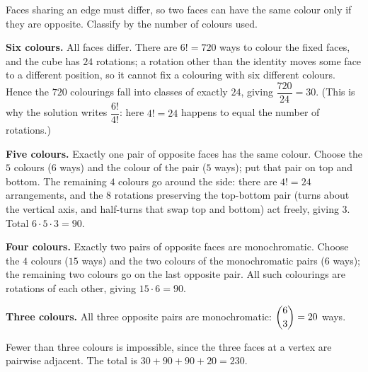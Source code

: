 Faces sharing an edge must differ, so two faces can have the same colour only if they are opposite. Classify by the number of colours used.

\textbf{Six colours.} All faces differ. There are $6!=720$ ways to colour the fixed faces, and the cube has $24$ rotations; a rotation other than the identity moves some face to a different position, so it cannot fix a colouring with six different colours. Hence the $720$ colourings fall into classes of exactly $24$, giving $\dfrac{720}{24}=30$. (This is why the solution writes $\dfrac{6!}{4!}$: here $4!=24$ happens to equal the number of rotations.)

\textbf{Five colours.} Exactly one pair of opposite faces has the same colour. Choose the $5$ colours ($6$ ways) and the colour of the pair ($5$ ways); put that pair on top and bottom. The remaining $4$ colours go around the side: there are $4!=24$ arrangements, and the $8$ rotations preserving the top-bottom pair (turns about the vertical axis, and half-turns that swap top and bottom) act freely, giving $3$. Total $6\cdot5\cdot3=90$.

\textbf{Four colours.} Exactly two pairs of opposite faces are monochromatic. Choose the $4$ colours ($15$ ways) and the two colours of the monochromatic pairs ($6$ ways); the remaining two colours go on the last opposite pair. All such colourings are rotations of each other, giving $15\cdot6=90$.

\textbf{Three colours.} All three opposite pairs are monochromatic: $\dbinom63=20$ ways.

Fewer than three colours is impossible, since the three faces at a vertex are pairwise adjacent. The total is $30+90+90+20=\boxed{230}$.

